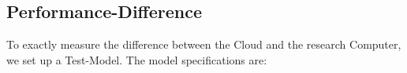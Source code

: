 






 

\subsection{Performance-Difference}
To exactly measure the difference between the Cloud and the research Computer, we set up a Test-Model. The model specifications are: 
 

